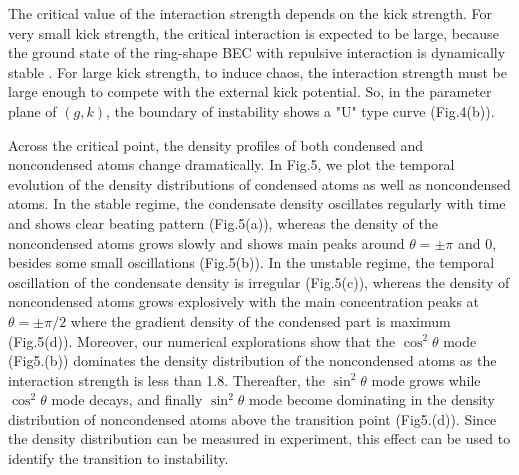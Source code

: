 \documentclass[twocolumn,prl,aps,showpacs]{revtex4}
\begin{document}
The critical value of the  interaction strength   depends on the 
kick strength.
For  very small kick strength, the critical interaction is expected to
be large, because the ground state of the ring-shape BEC with repulsive interaction
is dynamically stable \cite{biao}. For  large kick strength, 
to induce chaos,
the interaction strength must be large  enough to compete with the 
external kick potential.
So, in the parameter plane of $(g,k)$, the boundary
of instability shows a "U" type curve (Fig.4(b)).


Across the critical point, the  
density profiles of both condensed and noncondensed atoms
change dramatically.
In Fig.5, we plot the temporal evolution of the  density distributions of 
condensed atoms  as well 
as noncondensed atoms.
In the stable regime, the condensate density oscillates 
regularly with time and shows clear beating pattern (Fig.5(a)), whereas 
the  density of the  noncondensed atoms grows slowly 
and shows main peaks around  $\theta=\pm \pi$ and $0$, besides some
small oscillations (Fig.5(b)).
In the unstable regime, the temporal oscillation of the
condensate density is irregular (Fig.5(c)),
whereas the density of noncondensed atoms  grows explosively with the 
main concentration peaks at $\theta=\pm \pi/2$ where
the gradient density of the condensed part is maximum 
(Fig.5(d)).
Moreover,
our numerical explorations show  that 
the $\cos^{2}\theta$ mode (Fig5.(b)) dominates
the density distribution of the 
noncondensed atoms as the interaction strength  is less than 1.8. 
Thereafter, the
$\sin^{2}\theta$ mode grows while $\cos^{2}\theta$ mode
decays, and finally $\sin^{2}\theta$ mode 
become dominating in the
density distribution of noncondensed atoms above  the transition 
point (Fig5.(d)). 
Since the density distribution can be measured in experiment, this effect can be used to identify the transition to instability.
\end{document}
